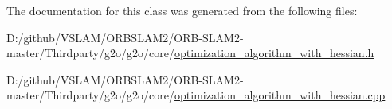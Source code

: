 The documentation for this class was generated from the following files\+:\begin{DoxyCompactItemize}
\item 
D\+:/github/\+V\+S\+L\+A\+M/\+O\+R\+B\+S\+L\+A\+M2/\+O\+R\+B-\/\+S\+L\+A\+M2-\/master/\+Thirdparty/g2o/g2o/core/\mbox{\hyperlink{optimization__algorithm__with__hessian_8h}{optimization\+\_\+algorithm\+\_\+with\+\_\+hessian.\+h}}\item 
D\+:/github/\+V\+S\+L\+A\+M/\+O\+R\+B\+S\+L\+A\+M2/\+O\+R\+B-\/\+S\+L\+A\+M2-\/master/\+Thirdparty/g2o/g2o/core/\mbox{\hyperlink{optimization__algorithm__with__hessian_8cpp}{optimization\+\_\+algorithm\+\_\+with\+\_\+hessian.\+cpp}}\end{DoxyCompactItemize}
